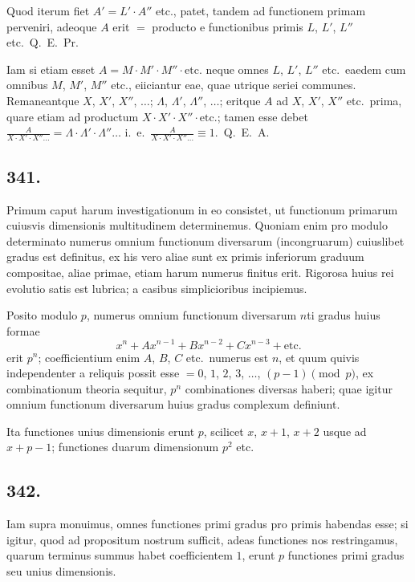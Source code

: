 \documentclass[12pt]{article}
\begin{document}
Quod iterum fiet $A'=L'\cdot A''$ etc., patet, tandem ad functionem primam perveniri, adeoque $A$ erit $=$ producto e functionibus primis $L$, $L'$, $L''$ etc.~Q.~E.~Pr.

Iam si etiam esset $A=M\cdot M'\cdot M''\cdot \text{etc.}$ neque omnes $L$, $L'$, $L''$ etc.~eaedem cum omnibus $M$, $M'$, $M''$ etc., eiiciantur eae, quae utrique seriei communes. Remaneantque $X$, $X'$, $X''$, $\ldots$; $\Lambda$, $\Lambda'$, $\Lambda''$, $\ldots$; eritque $A$ ad $X$, $X'$, $X''$ etc.~prima, quare etiam ad productum $X\cdot X'\cdot X''\cdot \text{etc.}$; tamen esse debet $\frac{A}{X\cdot X'\cdot X''\ldots} = \Lambda\cdot \Lambda'\cdot \Lambda''\ldots$ i.~e.~$\frac{A}{X\cdot X'\cdot X''\ldots} \equiv 1$.~Q.~E.~A.

\subsection*{341.}

Primum caput harum investigationum in eo consistet, ut functionum primarum cuiusvis dimensionis multitudinem determinemus. Quoniam enim pro modulo determinato numerus omnium functionum diversarum (incongruarum) cuiuslibet gradus est definitus, ex his vero aliae sunt ex primis inferiorum graduum compositae, aliae primae, etiam harum numerus finitus erit. Rigorosa huius rei evolutio satis est lubrica; a casibus simplicioribus incipiemus.

Posito modulo $p$, numerus omnium functionum diversarum $n$ti gradus huius formae
\[
x^n + Ax^{n-1} + Bx^{n-2} + Cx^{n-3} + \text{etc.}
\]
erit $p^n$; coefficientium enim $A$, $B$, $C$ etc.~numerus est $n$, et quum quivis independenter a reliquis possit esse $=0$, $1$, $2$, $3$, $\ldots$, $(p-1)\pmod{p}$, ex combinationum theoria sequitur, $p^n$ combinationes diversas haberi; quae igitur omnium functionum diversarum huius gradus complexum definiunt.

Ita functiones unius dimensionis erunt $p$, scilicet $x$, $x+1$, $x+2$ usque ad $x+p-1$; functiones duarum dimensionum $p^2$ etc.

\subsection*{342.}

Iam supra monuimus, omnes functiones primi gradus pro primis habendas esse; si igitur, quod ad propositum nostrum sufficit, adeas functiones nos restringamus, quarum terminus summus habet coefficientem $1$, erunt $p$ functiones primi gradus seu unius dimensionis.
\end{document}
